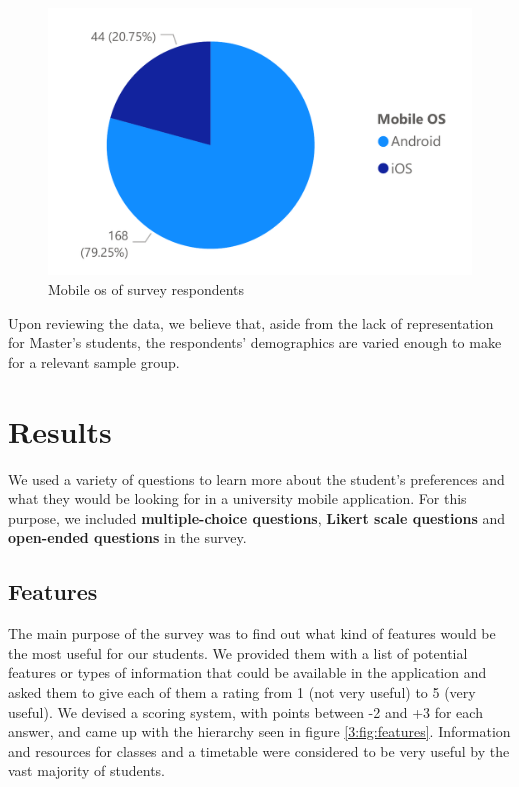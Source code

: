 \begin{figure}[ht]
    \centering
         \includegraphics[height=0.2\textheight]{figures/charts/survey/os.pdf}
    \caption{Mobile \acrshort{os} of survey respondents}
    \label{3:fig:os}
\end{figure}

Upon reviewing the data, we believe that, aside from the lack of representation for Master's students, the respondents' demographics are varied enough to make for a relevant sample group.

\section{Results} \label{3:results}

We used a variety of questions to learn more about the student's preferences and what they would be looking for in a university mobile application. For this purpose, we included \textbf{multiple-choice questions}, \textbf{Likert scale questions} and \textbf{open-ended questions} in the survey.

\subsection{Features} \label{3:features}

The main purpose of the survey was to find out what kind of features would be the most useful for our students. We provided them with a list of potential features or types of information that could be available in the application and asked them to give each of them a rating from 1 (not very useful) to 5 (very useful). We devised a scoring system, with points between -2 and +3 for each answer, and came up with the hierarchy seen in figure \ref{3:fig:features}. Information and resources for classes and a timetable were considered to be very useful by the vast majority of students.

